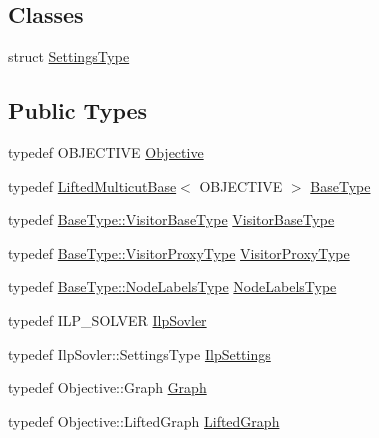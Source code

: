 \subsection*{Classes}
\begin{DoxyCompactItemize}
\item 
struct \hyperlink{structnifty_1_1graph_1_1optimization_1_1lifted__multicut_1_1LiftedMulticutIlp_1_1SettingsType}{Settings\+Type}
\end{DoxyCompactItemize}
\subsection*{Public Types}
\begin{DoxyCompactItemize}
\item 
typedef O\+B\+J\+E\+C\+T\+I\+V\+E \hyperlink{classnifty_1_1graph_1_1optimization_1_1lifted__multicut_1_1LiftedMulticutIlp_acde6c20c80ff731341a83218d4c6fcd7}{Objective}
\item 
typedef \hyperlink{classnifty_1_1graph_1_1optimization_1_1lifted__multicut_1_1LiftedMulticutBase}{Lifted\+Multicut\+Base}$<$ O\+B\+J\+E\+C\+T\+I\+V\+E $>$ \hyperlink{classnifty_1_1graph_1_1optimization_1_1lifted__multicut_1_1LiftedMulticutIlp_a07444a808d38c6296c0dcdde5801e465}{Base\+Type}
\item 
typedef \hyperlink{classnifty_1_1graph_1_1optimization_1_1common_1_1SolverBase_a5a14d64c70a9cc0eebc7d71d2b089f9b}{Base\+Type\+::\+Visitor\+Base\+Type} \hyperlink{classnifty_1_1graph_1_1optimization_1_1lifted__multicut_1_1LiftedMulticutIlp_a2e08b1b4250ea071d1ecb321e1fd5c06}{Visitor\+Base\+Type}
\item 
typedef \hyperlink{classnifty_1_1graph_1_1optimization_1_1common_1_1SolverBase_a58913ea9ab9232ff72608b710c1012d0}{Base\+Type\+::\+Visitor\+Proxy\+Type} \hyperlink{classnifty_1_1graph_1_1optimization_1_1lifted__multicut_1_1LiftedMulticutIlp_a1d6ef354f5ba27268ea186b9eb4ea4f5}{Visitor\+Proxy\+Type}
\item 
typedef \hyperlink{classnifty_1_1graph_1_1optimization_1_1common_1_1SolverBase_a6e4e465f3b6e039882669fcfb9714818}{Base\+Type\+::\+Node\+Labels\+Type} \hyperlink{classnifty_1_1graph_1_1optimization_1_1lifted__multicut_1_1LiftedMulticutIlp_ac01a83852272468cca5c54bf5f2d4f80}{Node\+Labels\+Type}
\item 
typedef I\+L\+P\+\_\+\+S\+O\+L\+V\+E\+R \hyperlink{classnifty_1_1graph_1_1optimization_1_1lifted__multicut_1_1LiftedMulticutIlp_a45204cab15ec1bf6d3b20d76dde5fbe6}{Ilp\+Sovler}
\item 
typedef Ilp\+Sovler\+::\+Settings\+Type \hyperlink{classnifty_1_1graph_1_1optimization_1_1lifted__multicut_1_1LiftedMulticutIlp_a743d074db63df1f079c6a72610e49534}{Ilp\+Settings}
\item 
typedef Objective\+::\+Graph \hyperlink{classnifty_1_1graph_1_1optimization_1_1lifted__multicut_1_1LiftedMulticutIlp_a792a6cce4dd71460ad9618c5364f852e}{Graph}
\item 
typedef Objective\+::\+Lifted\+Graph \hyperlink{classnifty_1_1graph_1_1optimization_1_1lifted__multicut_1_1LiftedMulticutIlp_ad8057c721c34ae69c4a59d39fb7aedd7}{Lifted\+Graph}
\end{DoxyCompactItemize}
